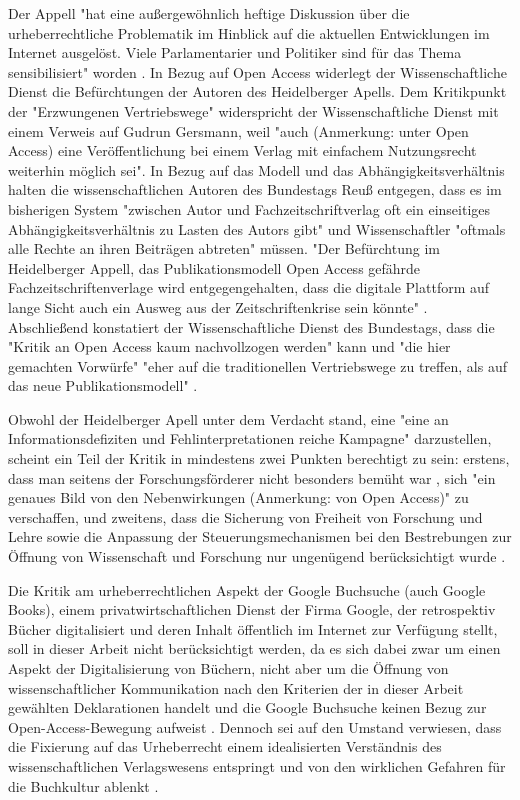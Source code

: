 Der Appell "hat eine außergewöhnlich heftige Diskussion über die urheberrechtliche Problematik im Hinblick auf die aktuellen Entwicklungen im Internet ausgelöst. Viele Parlamentarier und Politiker sind für das Thema sensibilisiert" worden \cite{Cloes_2009}. In Bezug auf Open Access widerlegt der Wissenschaftliche Dienst die Befürchtungen der Autoren des Heidelberger Apells. Dem Kritikpunkt der "Erzwungenen Vertriebswege" widerspricht der Wissenschaftliche Dienst mit einem Verweis auf Gudrun Gersmann, weil "auch (Anmerkung: unter Open Access) eine Veröffentlichung bei einem Verlag mit einfachem Nutzungsrecht weiterhin möglich sei". In Bezug auf das Modell und das Abhängigkeitsverhältnis halten die wissenschaftlichen Autoren des Bundestags Reuß entgegen, dass es im bisherigen System "zwischen Autor und Fachzeitschriftverlag oft ein einseitiges Abhängigkeitsverhältnis zu Lasten des Autors gibt" und Wissenschaftler "oftmals alle Rechte an ihren Beiträgen abtreten" \cite{Cloes_2009} müssen. "Der Befürchtung im Heidelberger Appell, das Publikationsmodell Open Access gefährde Fachzeitschriftenverlage wird entgegengehalten, dass die digitale Plattform auf lange Sicht auch ein Ausweg aus der Zeitschriftenkrise sein könnte" \cite{Cloes_2009}. Abschließend konstatiert der Wissenschaftliche Dienst des Bundestags, dass die "Kritik an Open Access kaum nachvollzogen werden" kann und "die hier gemachten Vorwürfe" "eher auf die traditionellen Vertriebswege zu treffen, als auf das neue Publikationsmodell" \cite{Cloes_2009}.

Obwohl der Heidelberger Apell unter dem Verdacht stand, eine "eine an Informationsdefiziten und Fehlinterpretationen reiche Kampagne" \cite{Schmidt_2009} darzustellen, scheint ein Teil der Kritik in mindestens zwei Punkten berechtigt zu sein: erstens, dass man seitens der Forschungsförderer nicht besonders bemüht war \cite{Heidelberger_Appell_2009}, sich "ein genaues Bild von den Nebenwirkungen (Anmerkung: von Open Access)" \cite{Reuss_2009} zu verschaffen, und zweitens, dass die Sicherung von Freiheit von Forschung und Lehre sowie die Anpassung der Steuerungsmechanismen bei den Bestrebungen zur Öffnung von Wissenschaft und Forschung nur ungenügend berücksichtigt wurde \cite{Hagner_2015}.

Die Kritik am urheberrechtlichen Aspekt der Google Buchsuche (auch Google Books), einem privatwirtschaftlichen Dienst der Firma Google, der retrospektiv Bücher digitalisiert und deren Inhalt öffentlich im Internet zur Verfügung stellt, soll in dieser Arbeit nicht berücksichtigt werden, da es sich dabei zwar um einen Aspekt der Digitalisierung von Büchern, nicht aber um die Öffnung von wissenschaftlicher Kommunikation nach den Kriterien der in dieser Arbeit gewählten Deklarationen handelt und die Google Buchsuche keinen Bezug zur Open-Access-Bewegung aufweist \cite{Hagner_2015}. Dennoch sei auf den Umstand verwiesen, dass die Fixierung auf das Urheberrecht einem idealisierten Verständnis des wissenschaftlichen Verlagswesens entspringt und von den wirklichen Gefahren für die Buchkultur ablenkt \cite{Hirschi_2015}.


